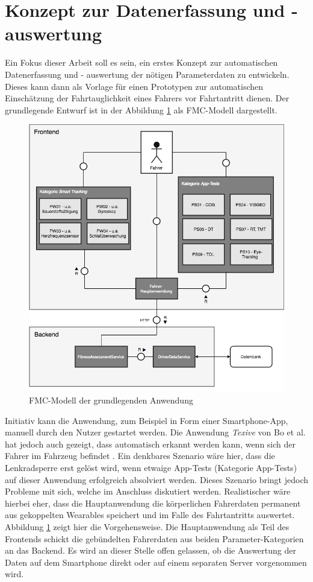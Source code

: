 \section{Konzept zur Datenerfassung und - auswertung}
\label{concept}
Ein Fokus dieser Arbeit soll es sein, ein erstes Konzept zur automatischen Datenerfassung und - auswertung der nötigen Parameterdaten zu entwickeln. Dieses kann dann als Vorlage für einen Prototypen zur automatischen Einschätzung der Fahrtauglichkeit eines Fahrers vor Fahrtantritt dienen. Der grundlegende Entwurf ist in der Abbildung \ref{fig:conceptfmc} als FMC-Modell dargestellt.

\begin{figure}
	\centering
	\includegraphics[width=\linewidth]{images/ConceptDriverAssessmentData}
	\caption[Caption for concept]{FMC-Modell der grundlegenden Anwendung}
	\label{fig:conceptfmc}
\end{figure}

Initiativ kann die Anwendung, zum Beispiel in Form einer Smartphone-App, manuell durch den Nutzer gestartet werden. Die Anwendung \textit{Texive} von Bo et al. hat jedoch auch gezeigt, dass automatisch erkannt werden kann, wenn sich der Fahrer im Fahrzeug befindet \cite{texive}. Ein denkbares Szenario wäre hier, dass die Lenkradsperre erst gelöst wird, wenn etwaige App-Tests (Kategorie App-Tests) auf dieser Anwendung erfolgreich absolviert werden. Dieses Szenario bringt jedoch Probleme mit sich, welche im Anschluss diskutiert werden. Realistischer wäre hierbei eher, dass die Hauptanwendung die körperlichen Fahrerdaten permanent aus gekoppelten  Wearables speichert und im Falle des Fahrtantritts auswertet. Abbildung \ref{fig:conceptfmc} zeigt hier die Vorgehensweise. Die Hauptanwendung als Teil des Frontends schickt die gebündelten Fahrerdaten aus beiden Parameter-Kategorien an das Backend. Es wird an dieser Stelle offen gelassen, ob die Auswertung der Daten auf dem Smartphone direkt oder auf einem separaten Server vorgenommen wird.

